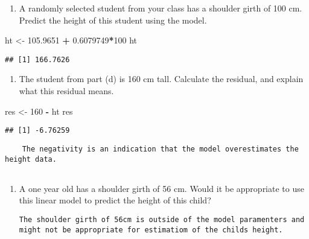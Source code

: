 \documentclass[]{article}
\newenvironment{Shaded}{\begin{snugshade}}{\end{snugshade}}
\newcommand{\DecValTok}[1]{\textcolor[rgb]{0.00,0.00,0.81}{#1}}
\newcommand{\FloatTok}[1]{\textcolor[rgb]{0.00,0.00,0.81}{#1}}
\newcommand{\StringTok}[1]{\textcolor[rgb]{0.31,0.60,0.02}{#1}}
\newcommand{\OperatorTok}[1]{\textcolor[rgb]{0.81,0.36,0.00}{\textbf{#1}}}
\newcommand{\NormalTok}[1]{#1}
\providecommand{\tightlist}{%
  \setlength{\itemsep}{0pt}\setlength{\parskip}{0pt}}
\begin{document}
\begin{enumerate}
\def\labelenumi{(\alph{enumi})}
\setcounter{enumi}{3}
\tightlist
\item
  A randomly selected student from your class has a shoulder girth of
  100 cm. Predict the height of this student using the model.
\end{enumerate}

\begin{Shaded}
\begin{Highlighting}[]
\NormalTok{ht <-}\StringTok{ }\FloatTok{105.9651} \OperatorTok{+}\StringTok{ }\FloatTok{0.6079749}\OperatorTok{*}\DecValTok{100}
\NormalTok{ht}
\end{Highlighting}
\end{Shaded}

\begin{verbatim}
## [1] 166.7626
\end{verbatim}

\begin{enumerate}
\def\labelenumi{(\alph{enumi})}
\setcounter{enumi}{4}
\tightlist
\item
  The student from part (d) is 160 cm tall. Calculate the residual, and
  explain what this residual means.
\end{enumerate}

\begin{Shaded}
\begin{Highlighting}[]
\NormalTok{res <-}\StringTok{ }\DecValTok{160} \OperatorTok{-}\StringTok{ }\NormalTok{ht}
\NormalTok{res}
\end{Highlighting}
\end{Shaded}

\begin{verbatim}
## [1] -6.76259
\end{verbatim}

\begin{verbatim}
    The negativity is an indication that the model overestimates the height data.
    
\end{verbatim}

\begin{enumerate}
\def\labelenumi{(\alph{enumi})}
\setcounter{enumi}{5}
\item
  A one year old has a shoulder girth of 56 cm. Would it be appropriate
  to use this linear model to predict the height of this child?

\begin{verbatim}
The shoulder girth of 56cm is outside of the model paramenters and might not be appropriate for estimatiom of the childs height.
\end{verbatim}
\end{enumerate}
\end{document}
